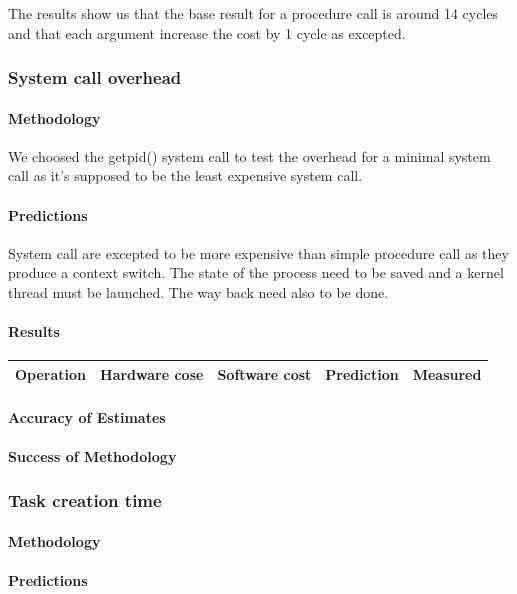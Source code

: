The results show us that the base result for a procedure call is around 14
cycles and that each argument increase the cost by 1 cycle as excepted.

\subsubsection{System call overhead}
\paragraph{Methodology}
We choosed the getpid() system call to test the overhead for a minimal system
call as it's supposed to be the least expensive system call.

\paragraph{Predictions}
System call are excepted to be more expensive than simple procedure call as they
produce a context switch.
The state of the process need to be saved and a kernel thread must be launched.
The way back need also to be done.

\paragraph{Results}

\begin{tabular}{| l | l | l | l | l |}
\hline
Operation & Hardware cose & Software cost & Prediction & Measured \\
\hline
\end{tabular}
\paragraph{Accuracy of Estimates}
\paragraph{Success of Methodology}

\subsubsection{Task creation time}
\paragraph{Methodology}
\paragraph{Predictions}
